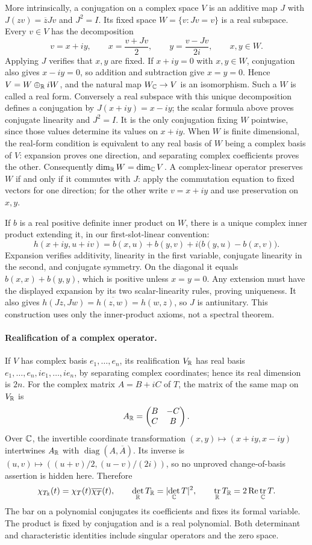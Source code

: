 \documentclass[11pt,a4paper]{book}
\theoremstyle{definition}\newtheorem{definition}[theorem]{Definition}
\theoremstyle{remark}\newtheorem{remark}[theorem]{Remark}
\DeclareMathOperator{\tr}{tr}\DeclareMathOperator{\Span}{span}
\DeclareMathOperator{\diag}{diag}\DeclareMathOperator{\id}{id}
\newcommand{\abs}[1]{\lvert #1\rvert}
\begin{document}
More intrinsically, a conjugation on a complex space $V$ is an additive map $J$ with $J(zv)=\overline zJv$ and $J^2=I$. Its fixed space $W=\{v:Jv=v\}$ is a real subspace. Every $v\in V$ has the decomposition
\[v=x+iy,\qquad x=\frac{v+Jv}{2},\qquad y=\frac{v-Jv}{2i},\qquad x,y\in W.
\]
Applying $J$ verifies that $x,y$ are fixed. If $x+iy=0$ with $x,y\in W$, conjugation also gives $x-iy=0$, so addition and subtraction give $x=y=0$. Hence $V=W\oplus_\mathbb R iW$, and the natural map $W_\mathbb C\to V$ is an isomorphism. Such a $W$ is called a real form. Conversely a real subspace with this unique decomposition defines a conjugation by $J(x+iy)=x-iy$; the scalar formula above proves conjugate linearity and $J^2=I$. It is the only conjugation fixing $W$ pointwise, since those values determine its values on $x+iy$. When $W$ is finite dimensional, the real-form condition is equivalent to any real basis of $W$ being a complex basis of $V$: expansion proves one direction, and separating complex coefficients proves the other. Consequently $\dim_\mathbb R W=\dim_\mathbb C V$. A complex-linear operator preserves $W$ if and only if it commutes with $J$: apply the commutation equation to fixed vectors for one direction; for the other write $v=x+iy$ and use preservation on $x,y$.

If $b$ is a real positive definite inner product on $W$, there is a unique complex inner product extending it, in our first-slot-linear convention:
\[h(x+iy,u+iv)=b(x,u)+b(y,v)+i\bigl(b(y,u)-b(x,v)\bigr).
\]
Expansion verifies additivity, linearity in the first variable, conjugate linearity in the second, and conjugate symmetry. On the diagonal it equals $b(x,x)+b(y,y)$, which is positive unless $x=y=0$. Any extension must have the displayed expansion by its two scalar-linearity rules, proving uniqueness. It also gives $h(Jz,Jw)=\overline{h(z,w)}=h(w,z)$, so $J$ is antiunitary. This construction uses only the inner-product axioms, not a spectral theorem.

\paragraph{Realification of a complex operator.}
If $V$ has complex basis $e_1,\ldots,e_n$, its realification $V_\mathbb R$ has real basis $e_1,\ldots,e_n,ie_1,\ldots,ie_n$, by separating complex coordinates; hence its real dimension is $2n$. For the complex matrix $A=B+iC$ of $T$, the matrix of the same map on $V_\mathbb R$ is
\[A_\mathbb R=\begin{pmatrix}B&-C\\ C&B\end{pmatrix}.
\]
Over $\mathbb C$, the invertible coordinate transformation $(x,y)\mapsto(x+iy,x-iy)$ intertwines $A_\mathbb R$ with $\diag(A,\overline A)$. Its inverse is $(u,v)\mapsto((u+v)/2,(u-v)/(2i))$, so no unproved change-of-basis assertion is hidden here. Therefore
\[\chi_{T_\R}(t)=\chi_T(t)\overline{\chi_T}(t),\qquad
\det_\R T_\R=\abs{\det_\C T}^2,\qquad
\tr_\R T_\R=2\operatorname{Re}\tr_\C T.
\]
The bar on a polynomial conjugates its coefficients and fixes its formal variable. The product is fixed by conjugation and is a real polynomial. Both determinant and characteristic identities include singular operators and the zero space.
\end{document}
